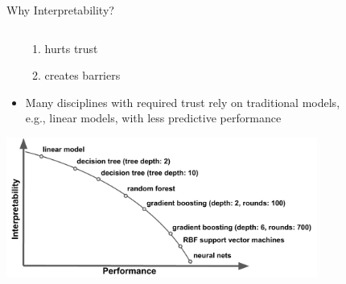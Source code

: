 \documentclass[11pt,compress,t,notes=noshow, aspectratio=169, xcolor=table]{beamer}
\begin{document}
\begin{frame}{Why Interpretability?}
\begin{columns}[T, totalwidth=\textwidth]
\begin{column}{0.8\textwidth}
\begin{itemize}
{\begin{enumerate}
				\item hurts trust
				\item creates barriers
			\end{enumerate}}
			\item<4->[\,$\leadsto$] Many disciplines with required trust rely on traditional models,\\ e.g., linear models, with less predictive performance   
		\end{itemize}
    \centering\includegraphics[width=0.8\textwidth]{figure/performance_vs_interpretability.pdf}
	\end{column}
	\begin{column}{0.2\textwidth}  %
        \centering

\end{column}
\end{columns}
\end{frame}
\end{document}
